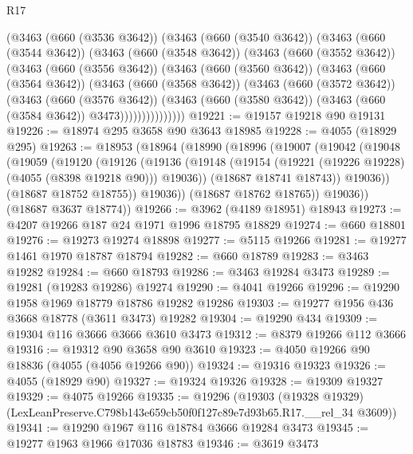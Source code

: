 \begin{lexlean}{R17}
\begin{coremodule}
        (@3463
          (@660 (@3536 @3642))
          (@3463
            (@660 (@3540 @3642))
            (@3463
              (@660 (@3544 @3642))
              (@3463
                (@660 (@3548 @3642))
                (@3463
                  (@660 (@3552 @3642))
                  (@3463
                    (@660 (@3556 @3642))
                    (@3463
                      (@660 (@3560 @3642))
                      (@3463
                        (@660 (@3564 @3642))
                        (@3463
                          (@660 (@3568 @3642))
                          (@3463
                            (@660 (@3572 @3642))
                            (@3463
                              (@660 (@3576 @3642))
                              (@3463
                                (@660 (@3580 @3642))
                                (@3463 (@660 (@3584 @3642)) @3473)))))))))))))))
@19221 := @19157 @19218 @90 @19131
@19226 := @18974 @295 @3658 @90 @3643 @18985
@19228 := @4055 (@18929 @295)
@19263 := @18953
    (@18964
      (@18990
        (@18996
          (@19007
            (@19042
              (@19048
                (@19059
                  (@19120
                    (@19126
                      (@19136
                        (@19148 (@19154 (@19221 (@19226 @19228) (@4055 (@8398 @19218 @90))) @19036))
                        (@18687 @18741 @18743))
                      @19036))
                  (@18687 @18752 @18755))
                @19036))
            (@18687 @18762 @18765))
          @19036))
      (@18687 @3637 @18774))
@19266 := @3962 (@4189 @18951) @18943
@19273 := @4207 @19266 @187 @24 @1971 @1996 @18795 @18829
@19274 := @660 @18801
@19276 := @19273 @19274 @18898
@19277 := @5115 @19266
@19281 := @19277 @1461 @1970 @18787 @18794
@19282 := @660 @18789
@19283 := @3463 @19282
@19284 := @660 @18793
@19286 := @3463 @19284 @3473
@19289 := @19281 (@19283 @19286) @19274
@19290 := @4041 @19266
@19296 := @19290 @1958 @1969 @18779 @18786 @19282 @19286
@19303 := @19277 @1956 @436 @3668 @18778 (@3611 @3473) @19282
@19304 := @19290 @434
@19309 := @19304 @116 @3666 @3666 @3610 @3473
@19312 := @8379 @19266 @112 @3666
@19316 := @19312 @90 @3658 @90 @3610
@19323 := @4050 @19266 @90 @18836 (@4055 (@4056 @19266 @90))
@19324 := @19316 @19323
@19326 := @4055 (@18929 @90)
@19327 := @19324 @19326
@19328 := @19309 @19327
@19329 := @4075 @19266
@19335 := @19296
    (@19303 (@19328 @19329) (LexLeanPreserve.C798b143e659cb50f0f127c89e7d93b65.R17.__rel_34 @3609))
@19341 := @19290 @1967 @116 @18784 @3666 @19284 @3473
@19345 := @19277 @1963 @1966 @17036 @18783
@19346 := @3619 @3473

\end{coremodule}
\end{lexlean}
